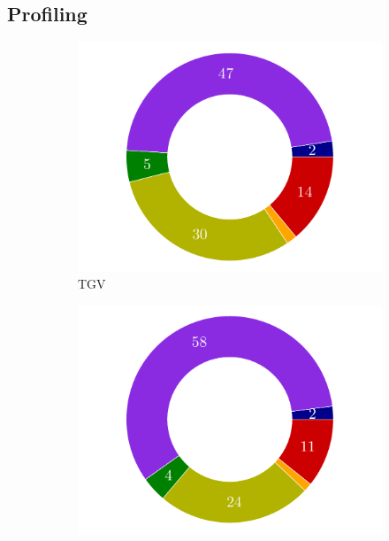 \documentclass[10pt,a4paper]{article}
\begin{document}
\subsection{Profiling}
\begin{figure}[!t]
  \centering
  \begin{subfigure}[t]{0.32\linewidth}
      \centering
      \includegraphics[width=\linewidth]{img/tgv_profiling.pdf}
      \caption{TGV\hspace*{1em}}
  \end{subfigure}
  \begin{subfigure}[t]{0.32\linewidth}
    \centering\hspace*{-0.5cm}
    \includegraphics[width=\linewidth]{img/sphere_profiling.pdf}

\end{subfigure}
\end{figure}
\end{document}
